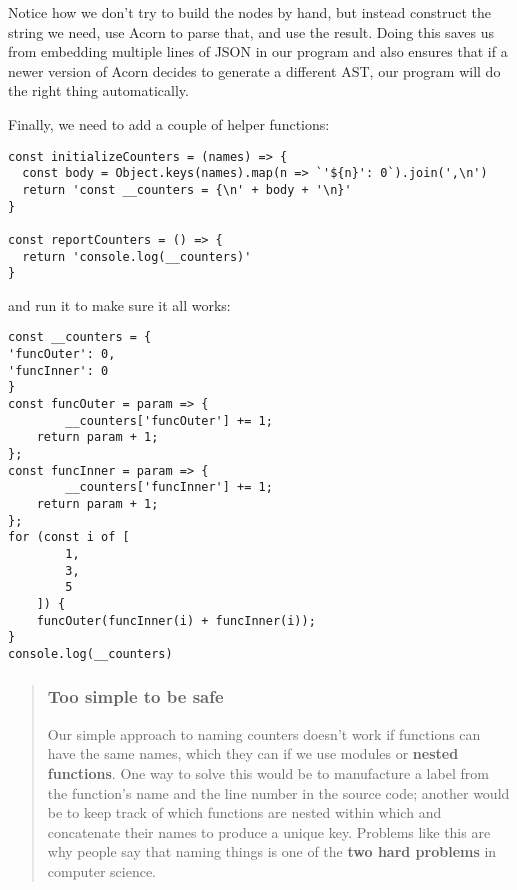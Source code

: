 \documentclass[krantzl]{krantz}
\newcommand{\glossref}[1]{\textbf{#1}}
\newenvironment{callout}{\savenotes\begin{tBox}\begin{quotation}\toggletrue{inbox}\renewcommand{\thempfootnote}{\arabic{footnote}}}{\end{quotation}\vspace{\baselineskip}\end{tBox}\togglefalse{inbox}\spewnotes}
\begin{document}
\noindent Notice how we don't try to build the nodes by hand,
but instead construct the string we need,
use Acorn to parse that,
and use the result.
Doing this saves us from embedding multiple lines of JSON in our program
and also ensures that if a newer version of Acorn decides to generate a different AST,
our program will do the right thing automatically.


Finally,
we need to add a couple of helper functions:


\begin{lstlisting}[frame=single,frameround=tttt]
const initializeCounters = (names) => {
  const body = Object.keys(names).map(n => `'${n}': 0`).join(',\n')
  return 'const __counters = {\n' + body + '\n}'
}

const reportCounters = () => {
  return 'console.log(__counters)'
}
\end{lstlisting}



\noindent and run it to make sure it all works:


\begin{lstlisting}[frame=single,frameround=tttt]
const __counters = {
'funcOuter': 0,
'funcInner': 0
}
const funcOuter = param => {
        __counters['funcOuter'] += 1;
    return param + 1;
};
const funcInner = param => {
        __counters['funcInner'] += 1;
    return param + 1;
};
for (const i of [
        1,
        3,
        5
    ]) {
    funcOuter(funcInner(i) + funcInner(i));
}
console.log(__counters)
\end{lstlisting}


\begin{callout}


\subsubsection*{Too simple to be safe}


Our simple approach to naming counters doesn't work if functions can have the same names,
which they can if we use modules or \glossref{nested functions}.
One way to solve this would be to manufacture a label from the function's name
and the line number in the source code;
another would be to keep track of which functions are nested within which
and concatenate their names to produce a unique key.
Problems like this are why people say that naming things
is one of the \glossref{two hard problems} in computer science.

\end{callout}
\end{document}
